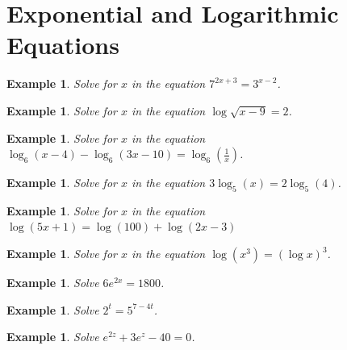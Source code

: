 \documentclass[twoside]{tufte-handout}
\newcommand{\booksection}{0}
\newcommand{\pageheader}{}
\newcounter{ekcounter}%
\theoremstyle{ekimcustom}
\newtheorem{exm}[ekcounter]{Example}
\begin{document}
\renewcommand{\booksection}{Exponential and Logarithmic Equations}
\renewcommand{\pageheader}{\booksection }
\section*{\LARGE \pageheader}
%

\everymath{\displaystyle}
\begin{exm}{Solve for $x$ in the equation  \quad
$7^{2x+3} = 3^{x-2}$.}
\end{exm}\vskip10pt

\begin{exm}{Solve for $x$ in the equation  \quad
$\log \sqrt{x-9} = 2$.}
\end{exm}\vskip10pt

\everymath{\displaystyle}
\begin{exm}{Solve for $x$ in the equation \quad\\
$\log_6(x-4) - \log_6(3x-10) = \log_6(\frac1x)$.}
\end{exm}\vskip10pt

\begin{exm}{Solve for $x$ in the equation \quad
$3 \log_5 (x) = 2 \log_5(4)$.}
\end{exm}\vskip10pt

\everymath{\displaystyle}
\begin{exm}{Solve for $x$ in the equation\\
$\log (5x+1) = \log(100) + \log(2x -3)$}
\end{exm}\vskip10pt

\begin{exm}{Solve for $x$ in the equation  \quad
$\log(x^3) = (\log x)^3$.}
\end{exm}\vskip10pt

\everymath{\displaystyle}
\begin{exm}{Solve $ 6e^{2x}=1800$. }
\end{exm}\vskip10pt

\begin{exm}{Solve $ 2^t=5^{7-4t}$.}
\end{exm}\vskip10pt

\everymath{\displaystyle}
\begin{exm}{Solve $ e^{2z}+3e^z-40=0$.}
\end{exm}\vskip10pt
\end{document}
